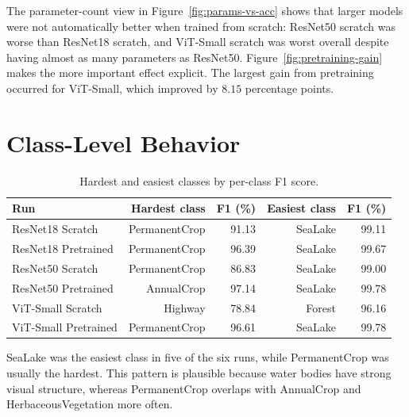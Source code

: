 \documentclass[11pt]{report}
\begin{document}
The parameter-count view in Figure~\ref{fig:params-vs-acc} shows that larger models were not automatically better when trained from scratch: ResNet50 scratch was worse than ResNet18 scratch, and ViT-Small scratch was worst overall despite having almost as many parameters as ResNet50. Figure~\ref{fig:pretraining-gain} makes the more important effect explicit. The largest gain from pretraining occurred for ViT-Small, which improved by \(8.15\) percentage points.

\section{Class-Level Behavior}
\begin{table}[h]
    \centering
    \caption{Hardest and easiest classes by per-class F1 score.}
    \label{tab:class-extremes}
    \begin{tabular}{lrrrr}
        \toprule
        Run & Hardest class & F1 (\%) & Easiest class & F1 (\%) \\
        \midrule
        ResNet18 Scratch & PermanentCrop & 91.13 & SeaLake & 99.11 \\
        ResNet18 Pretrained & PermanentCrop & 96.39 & SeaLake & 99.67 \\
        ResNet50 Scratch & PermanentCrop & 86.83 & SeaLake & 99.00 \\
        ResNet50 Pretrained & AnnualCrop & 97.14 & SeaLake & 99.78 \\
        ViT-Small Scratch & Highway & 78.84 & Forest & 96.16 \\
        ViT-Small Pretrained & PermanentCrop & 96.61 & SeaLake & 99.78 \\
        \bottomrule
    \end{tabular}
\end{table}

SeaLake was the easiest class in five of the six runs, while PermanentCrop was usually the hardest. This pattern is plausible because water bodies have strong visual structure, whereas PermanentCrop overlaps with AnnualCrop and HerbaceousVegetation more often.
\end{document}
